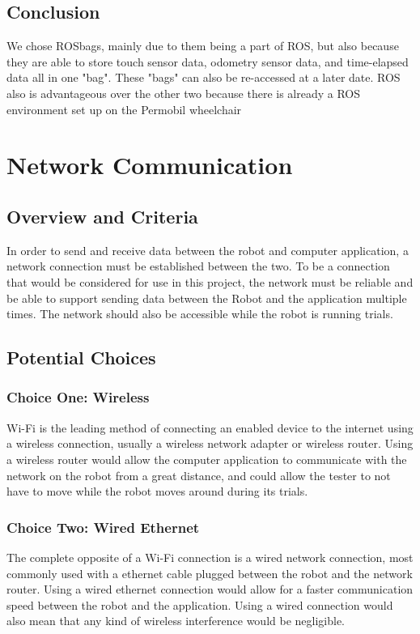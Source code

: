 \documentclass[onecolumn, draftclsnofoot,10pt, compsoc]{report}
\begin{document}
\subsection{Conclusion}
We chose ROSbags, mainly due to them being a part of ROS, but also because they are able to store touch sensor data, odometry sensor data, and time-elapsed data all in one "bag". These "bags" can also be re-accessed at a later date. ROS also is advantageous over the other two because there is already a ROS environment set up on the Permobil wheelchair

\section{Network Communication}
\subsection{Overview and Criteria}
In order to send and receive data between the robot and computer application, a network connection must be established between the two. To be a connection that would be considered for use in this project, the network must be reliable and be able to support sending data between the Robot and the application multiple times. The network should also be accessible while the robot is running trials.

\subsection{Potential Choices}
\subsubsection{Choice One: Wireless}
Wi-Fi is the leading method of connecting an enabled device to the internet using a wireless connection, usually a wireless network adapter or wireless router. Using a wireless router would allow the computer application to communicate with the network on the robot from a great distance, and could allow the tester to not have to move while the robot moves around during its trials.

\subsubsection{Choice Two: Wired Ethernet}
The complete opposite of a Wi-Fi connection is a wired network connection, most commonly used with a ethernet cable plugged between the robot and the network router. Using a wired ethernet connection would allow for a faster communication speed between the robot and the application. Using a wired connection would also mean that any kind of wireless interference would be negligible.
\end{document}
